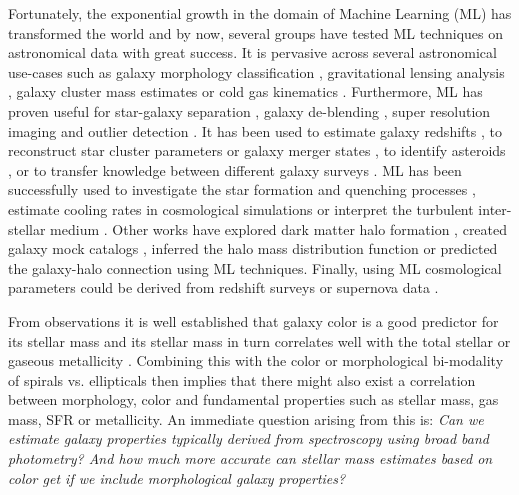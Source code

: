 \documentclass[conference]{IEEEtran}
\begin{document}
Fortunately, the exponential growth in the domain of Machine Learning (ML) has transformed the world \citep[e.g.][]{Ronneberger2015} and by now, several groups have tested ML techniques on astronomical data with great success. It is pervasive across several astronomical use-cases such as galaxy morphology classification \citep[e.g.][]{Dieleman2015,Huertas-Company2015,Beck2018,Hocking2018}, gravitational lensing analysis \citep[e.g.][]{Hezaveh2017,Lanusse2018,Petrillo2017,Petrillo2019,Jeffrey2020}, galaxy cluster mass estimates \citep[e.g.][]{Ntampaka2015,Ntampaka2018,Ntampaka2019,Ho2019} or cold gas kinematics \citep{Dawson2020}. Furthermore, ML has proven useful for star-galaxy separation \citep[e.g.][]{Kim2017,Bai2019}, galaxy de-blending \citep{Lanusse2019}, super resolution imaging \citep[e.g.][]{Falahkheirkhah2019} and outlier detection \citep{Margalef2020}. It has been used to estimate galaxy redshifts \citep{Soo2018,Menou2019,Wilson2020,Campagne2020}, to reconstruct star cluster parameters \citep{Pasquato2016,Pasquato2019} or galaxy merger states \citep{Bottrell2019}, to identify asteroids \citep[e.g.][]{Smirnov2017}, or to transfer knowledge between different galaxy surveys \citep{Dominguez2019,Perez2019}. ML has been successfully used to investigate the star formation and quenching processes \citep{Lovell2019,Bluck2020}, estimate cooling rates in cosmological simulations \citep{Galligan2019} or interpret the turbulent inter-stellar medium \citep[ISM,][]{Peek2019,vanOort2019}. Other works have explored dark matter halo formation \citep{Lucie-Smith2019}, created galaxy mock catalogs \citep[e.g.][]{Xu2013,Kamdar2016}, inferred the halo mass distribution function \citep{Charnock2020} or predicted the galaxy-halo connection \citep{Agarwal2018,Jo2019} using ML techniques. Finally, using ML cosmological parameters could be derived from redshift surveys \citep{Ramanah2019,Ntampaka2020} or supernova data \citep{Escamilla2020,Wang2020}.
	
From observations it is well established that galaxy color is a good predictor for its stellar mass \citep[e.g.][]{Bell2003,Zibetti2009} and its stellar mass in turn correlates well with the total stellar or gaseous metallicity \citep[e.g.][]{Tremonti2004,Gallazzi2005}. Combining this with the color or morphological bi-modality of spirals vs. ellipticals then implies that there might also exist a correlation between morphology, color and fundamental properties such as stellar mass, gas mass, SFR or metallicity. An immediate question arising from this is: \textit{Can we estimate galaxy properties typically derived from spectroscopy using broad band photometry? And how much more accurate can stellar mass estimates based on color get if we include morphological galaxy properties?}  
\end{document}
